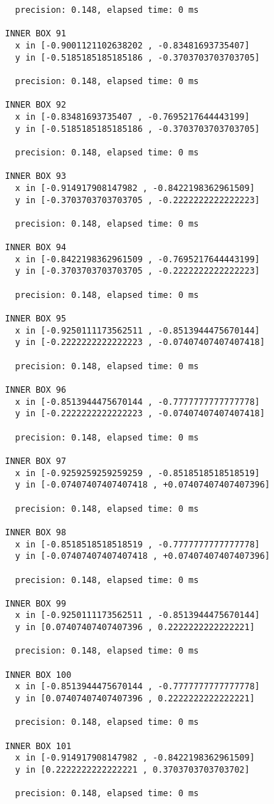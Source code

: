 \begin{verbatim}
  precision: 0.148, elapsed time: 0 ms

INNER BOX 91
  x in [-0.9001121102638202 , -0.83481693735407]
  y in [-0.5185185185185186 , -0.3703703703703705]

  precision: 0.148, elapsed time: 0 ms

INNER BOX 92
  x in [-0.83481693735407 , -0.7695217644443199]
  y in [-0.5185185185185186 , -0.3703703703703705]

  precision: 0.148, elapsed time: 0 ms

INNER BOX 93
  x in [-0.914917908147982 , -0.8422198362961509]
  y in [-0.3703703703703705 , -0.2222222222222223]

  precision: 0.148, elapsed time: 0 ms

INNER BOX 94
  x in [-0.8422198362961509 , -0.7695217644443199]
  y in [-0.3703703703703705 , -0.2222222222222223]

  precision: 0.148, elapsed time: 0 ms

INNER BOX 95
  x in [-0.9250111173562511 , -0.8513944475670144]
  y in [-0.2222222222222223 , -0.07407407407407418]

  precision: 0.148, elapsed time: 0 ms

INNER BOX 96
  x in [-0.8513944475670144 , -0.7777777777777778]
  y in [-0.2222222222222223 , -0.07407407407407418]

  precision: 0.148, elapsed time: 0 ms

INNER BOX 97
  x in [-0.9259259259259259 , -0.8518518518518519]
  y in [-0.07407407407407418 , +0.07407407407407396]

  precision: 0.148, elapsed time: 0 ms

INNER BOX 98
  x in [-0.8518518518518519 , -0.7777777777777778]
  y in [-0.07407407407407418 , +0.07407407407407396]

  precision: 0.148, elapsed time: 0 ms

INNER BOX 99
  x in [-0.9250111173562511 , -0.8513944475670144]
  y in [0.07407407407407396 , 0.2222222222222221]

  precision: 0.148, elapsed time: 0 ms

INNER BOX 100
  x in [-0.8513944475670144 , -0.7777777777777778]
  y in [0.07407407407407396 , 0.2222222222222221]

  precision: 0.148, elapsed time: 0 ms

INNER BOX 101
  x in [-0.914917908147982 , -0.8422198362961509]
  y in [0.2222222222222221 , 0.3703703703703702]

  precision: 0.148, elapsed time: 0 ms


\end{verbatim}
